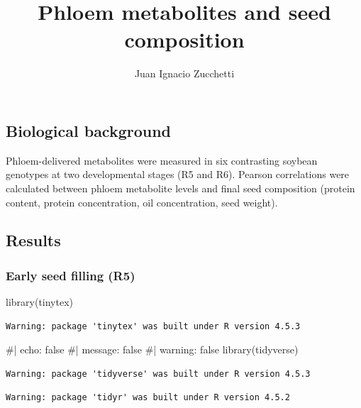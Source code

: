 \documentclass[
  letterpaper,
  DIV=11,
  numbers=noendperiod]{scrartcl}
\title{Phloem metabolites and seed composition}
\author{Juan Ignacio Zucchetti}
\date{}
\newenvironment{Shaded}{\begin{snugshade}}{\end{snugshade}}
\newcommand{\CommentTok}[1]{\textcolor[rgb]{0.37,0.37,0.37}{#1}}
\newcommand{\FunctionTok}[1]{\textcolor[rgb]{0.28,0.35,0.67}{#1}}
\newcommand{\NormalTok}[1]{\textcolor[rgb]{0.00,0.23,0.31}{#1}}
\begin{document}
\maketitle


\subsection{Biological background}\label{biological-background}

Phloem-delivered metabolites were measured in six contrasting soybean
genotypes at two developmental stages (R5 and R6). Pearson correlations
were calculated between phloem metabolite levels and final seed
composition (protein content, protein concentration, oil concentration,
seed weight).

\subsection{Results}\label{results}

\subsubsection{Early seed filling (R5)}\label{early-seed-filling-r5}

\begin{Shaded}
\begin{Highlighting}[]
\FunctionTok{library}\NormalTok{(tinytex)}
\end{Highlighting}
\end{Shaded}

\begin{verbatim}
Warning: package 'tinytex' was built under R version 4.5.3
\end{verbatim}

\begin{Shaded}
\begin{Highlighting}[]
\CommentTok{\#| echo: false}
\CommentTok{\#| message: false}
\CommentTok{\#| warning: false}
\FunctionTok{library}\NormalTok{(tidyverse)}
\end{Highlighting}
\end{Shaded}

\begin{verbatim}
Warning: package 'tidyverse' was built under R version 4.5.3
\end{verbatim}

\begin{verbatim}
Warning: package 'tidyr' was built under R version 4.5.2
\end{verbatim}
\end{document}

